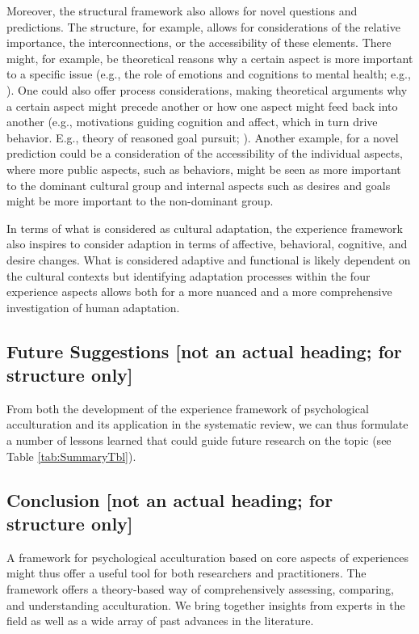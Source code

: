 \documentclass[man, 12pt, a4paper]{apa7}
\begin{document}
Moreover, the structural framework also allows for novel questions and predictions. The structure, for example, allows for considerations of the relative importance, the interconnections, or the accessibility of these elements. There might, for example, be theoretical reasons why a certain aspect is more important to a specific issue (e.g., the role of emotions and cognitions to mental health; e.g., \citealp{Crocker2013}). One could also offer process considerations, making theoretical arguments why a certain aspect might precede another or how one aspect might feed back into another (e.g., motivations guiding cognition and affect, which in turn drive behavior. E.g., theory of reasoned goal pursuit; \citealp{Ajzen2019}). Another example, for a novel prediction could be a consideration of the accessibility of the individual aspects, where more public aspects, such as behaviors, might be seen as more important to the dominant cultural group and internal aspects such as desires and goals might be more important to the non-dominant group.

In terms of what is considered as cultural adaptation, the experience framework also inspires to consider adaption in terms of affective, behavioral, cognitive, and desire changes. What is considered adaptive and functional is likely dependent on the cultural contexts but identifying adaptation processes within the four experience aspects allows both for a more nuanced and a more comprehensive investigation of human adaptation.

\subsection{Future Suggestions [not an actual heading; for structure only]}
From both the development of the experience framework of psychological acculturation and its application in the systematic review, we can thus formulate a number of lessons learned that could guide future research on the topic (see Table \ref{tab:SummaryTbl}).



\subsection{Conclusion [not an actual heading; for structure only]}
A framework for psychological acculturation based on core aspects of experiences might thus offer a useful tool for both researchers and practitioners. The framework offers a theory-based way of comprehensively assessing, comparing, and understanding acculturation. We bring together insights from experts in the field as well as a wide array of past advances in the literature.
\end{document}
